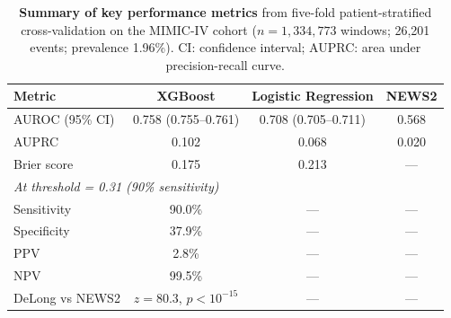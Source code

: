 \documentclass[12pt]{article}
\begin{document}
\clearpage

\begin{table}[H]
\centering
\caption{\textbf{Summary of key performance metrics} from five-fold
patient-stratified cross-validation on the MIMIC-IV cohort
($n = 1{,}334{,}773$ windows; 26{,}201 events; prevalence 1.96\%).
CI: confidence interval; AUPRC: area under precision-recall curve.}
\label{tab:metrics}
\begin{tabular}{lccc}
\toprule
\textbf{Metric} & \textbf{XGBoost} & \textbf{Logistic Regression} & \textbf{NEWS2} \\
\midrule
AUROC (95\% CI) & 0.758 (0.755--0.761) & 0.708 (0.705--0.711) & 0.568 \\
AUPRC           & 0.102 & 0.068 & 0.020 \\
Brier score     & 0.175 & 0.213 & --- \\
\midrule
\multicolumn{4}{l}{\textit{At threshold = 0.31 (90\% sensitivity)}} \\
Sensitivity     & 90.0\% & --- & --- \\
Specificity     & 37.9\% & --- & --- \\
PPV             & 2.8\%  & --- & --- \\
NPV             & 99.5\% & --- & --- \\
\midrule
DeLong vs NEWS2 & $z = 80.3$, $p < 10^{-15}$ & --- & --- \\
\bottomrule
\end{tabular}
\end{table}
\end{document}
